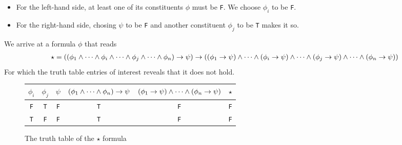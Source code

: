 \begin{itemize}
	\item For the left-hand side, at least one of its constituents $\phi$ must be
{\tt F}. We choose $\phi_i$ to be {\tt F}.

	\item For the right-hand side, chosing $\psi$ to be {\tt F} and another constituent
$\phi_j$ to be {\tt T} makes it so.
\end{itemize}

\noindent We arrive at a formula $\phi$ that reads
\scriptsize
\begin{align*}
	\star = 
	(
		(\phi_1 \land \dots \land \phi_i \land \dots \land \phi_j \land \dots \land \phi_n) \to \psi
	)
	\to
	(
		(\phi_1 \to \psi) \land \dots \land
		(\phi_i \to \psi) \land \dots \land
		(\phi_j \to \psi) \land \dots \land
		(\phi_n \to \psi)
	)
\end{align*}
\normalsize
For which the truth table entries of interest reveals that it does not hold.

\begin{figure}[H]
	\center
	\begin{tabular}{ccc|c|c|c}
		$\phi_i$ & $\phi_j$ & $\psi$
		& $(\phi_1 \land \dots \land \phi_n) \to \psi$
		& $(\phi_1 \to \psi) \land \dots \land (\phi_n \to \psi)$
		& $\star$ \\ \hline
		{\tt F} & {\tt T} & {\tt F} & {\tt T} & {\tt F} & {\tt F} \\
		{\tt T} & {\tt F} & {\tt F} & {\tt T} & {\tt F} & {\tt F} \\
	\end{tabular}
	\label{table:star-truth-table}
	\caption{The truth table of the $\star$ formula}
\end{figure}
